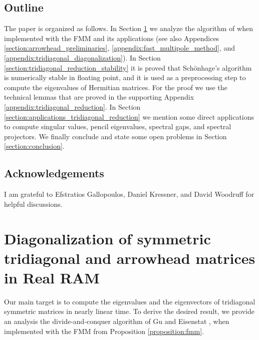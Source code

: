 \documentclass{article}
\begin{document}
\subsection{Outline}
The paper is organized as follows. In Section \ref{section:tridiagonal_diagonalization} we analyze the algorithm of \cite{gu1995divide} when implemented with the FMM and its applications (see also  Appendices \ref{section:arrowhead_preliminaries}, \ref{appendix:fast_multipole_method}, and \ref{appendix:tridiagonal_diagonalization}). In Section \ref{section:tridiagonal_reduction_stability} it is proved that Sch\"onhage's algorithm is numerically stable in floating point, and it is used as a preprocessing step to compute the eigenvalues of Hermitian matrices. For the proof we use the technical lemmas that are proved in the supporting Appendix \ref{appendix:tridiagonal_reduction}. In Section \ref{section:applications_tridiagonal_reduction} we mention some direct applications to compute singular values, pencil eigenvalues, spectral gaps, and spectral projectors. We finally conclude and state some open problems in Section \ref{section:conclusion}.

\subsection*{Acknowledgements}{
I am grateful to Efstratios Gallopoulos, Daniel Kressner, and David Woodruff for helpful discussions.}


\section{Diagonalization of symmetric tridiagonal and arrowhead matrices in Real RAM}
\label{section:tridiagonal_diagonalization}
Our main target is to compute the eigenvalues and the eigenvectors of tridiagonal symmetric matrices in nearly linear time. To derive the desired result, we provide an analysis the divide-and-conquer algorithm of Gu and Eisenstat \cite{gu1995divide}, when implemented with the FMM from Proposition \ref{proposition:fmm}.
\end{document}
